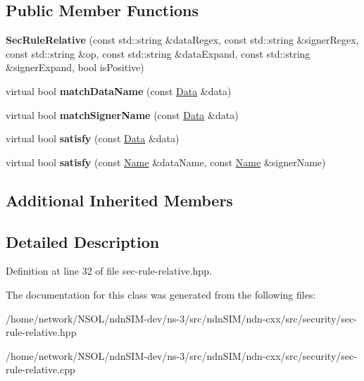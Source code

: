\subsection*{Public Member Functions}
\begin{DoxyCompactItemize}
\item 
{\bfseries Sec\+Rule\+Relative} (const std\+::string \&data\+Regex, const std\+::string \&signer\+Regex, const std\+::string \&op, const std\+::string \&data\+Expand, const std\+::string \&signer\+Expand, bool is\+Positive)\hypertarget{classndn_1_1SecRuleRelative_ae75d154107abd094ad47b9195aa3f896}{}\label{classndn_1_1SecRuleRelative_ae75d154107abd094ad47b9195aa3f896}

\item 
virtual bool {\bfseries match\+Data\+Name} (const \hyperlink{classndn_1_1Data}{Data} \&data)\hypertarget{classndn_1_1SecRuleRelative_af8784514368e22322a4690a460d81f0f}{}\label{classndn_1_1SecRuleRelative_af8784514368e22322a4690a460d81f0f}

\item 
virtual bool {\bfseries match\+Signer\+Name} (const \hyperlink{classndn_1_1Data}{Data} \&data)\hypertarget{classndn_1_1SecRuleRelative_a73a512a7d5b9f29d91bb9bd2b8e99197}{}\label{classndn_1_1SecRuleRelative_a73a512a7d5b9f29d91bb9bd2b8e99197}

\item 
virtual bool {\bfseries satisfy} (const \hyperlink{classndn_1_1Data}{Data} \&data)\hypertarget{classndn_1_1SecRuleRelative_a0c5f67a3a9c0971b34cfea187df409eb}{}\label{classndn_1_1SecRuleRelative_a0c5f67a3a9c0971b34cfea187df409eb}

\item 
virtual bool {\bfseries satisfy} (const \hyperlink{classndn_1_1Name}{Name} \&data\+Name, const \hyperlink{classndn_1_1Name}{Name} \&signer\+Name)\hypertarget{classndn_1_1SecRuleRelative_a6b673322b5de6b03159d76322e938f3b}{}\label{classndn_1_1SecRuleRelative_a6b673322b5de6b03159d76322e938f3b}

\end{DoxyCompactItemize}
\subsection*{Additional Inherited Members}


\subsection{Detailed Description}


Definition at line 32 of file sec-\/rule-\/relative.\+hpp.



The documentation for this class was generated from the following files\+:\begin{DoxyCompactItemize}
\item 
/home/network/\+N\+S\+O\+L/ndn\+S\+I\+M-\/dev/ns-\/3/src/ndn\+S\+I\+M/ndn-\/cxx/src/security/sec-\/rule-\/relative.\+hpp\item 
/home/network/\+N\+S\+O\+L/ndn\+S\+I\+M-\/dev/ns-\/3/src/ndn\+S\+I\+M/ndn-\/cxx/src/security/sec-\/rule-\/relative.\+cpp\end{DoxyCompactItemize}
